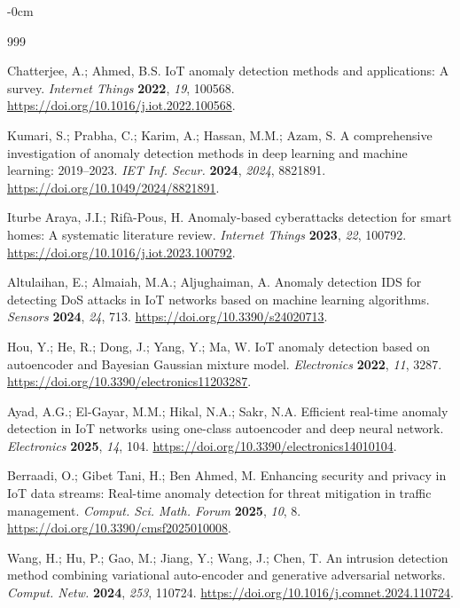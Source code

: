 \documentclass[futureinternet,article,accept,moreauthors]{Definitions/mdpi}
\begin{document}
\begin{adjustwidth}{-\extralength}{0cm}
\begin{thebibliography}{999}
  
  Chatterjee, A.; Ahmed, B.S. IoT anomaly detection methods and applications: A survey. \emph{Internet Things} \textbf{2022}, \emph{19}, 100568. \url{https://doi.org/10.1016/j.iot.2022.100568}.

  
  Kumari, S.; Prabha, C.; Karim, A.; Hassan, M.M.; Azam, S. A comprehensive investigation of anomaly detection methods in deep learning and machine learning: 2019--2023. \emph{IET Inf. Secur.} \textbf{2024}, \emph{2024}, 8821891. \url{https://doi.org/10.1049/2024/8821891}.

  
  Iturbe Araya, J.I.; Rifà-Pous, H. Anomaly-based cyberattacks detection for smart homes: A systematic literature review. \emph{Internet Things} \textbf{2023}, \emph{22}, 100792. \url{https://doi.org/10.1016/j.iot.2023.100792}.

  
  Altulaihan, E.; Almaiah, M.A.; Aljughaiman, A. Anomaly detection IDS for detecting DoS attacks in IoT networks based on machine learning algorithms. \emph{Sensors} \textbf{2024}, \emph{24}, 713. \url{https://doi.org/10.3390/s24020713}.

  
  Hou, Y.; He, R.; Dong, J.; Yang, Y.; Ma, W. IoT anomaly detection based on autoencoder and Bayesian Gaussian mixture model. \emph{Electronics} \textbf{2022}, \emph{11}, 3287. \url{https://doi.org/10.3390/electronics11203287}.

  
  Ayad, A.G.; El-Gayar, M.M.; Hikal, N.A.; Sakr, N.A. Efficient real-time anomaly detection in IoT networks using one-class autoencoder and deep neural network. \emph{Electronics} \textbf{2025}, \emph{14}, 104. \url{https://doi.org/10.3390/electronics14010104}.

  
  Berraadi, O.; Gibet Tani, H.; Ben Ahmed, M. Enhancing security and privacy in IoT data streams: Real-time anomaly detection for threat mitigation in traffic management. \emph{Comput. Sci. Math. Forum} \textbf{2025}, \emph{10}, 8. \url{https://doi.org/10.3390/cmsf2025010008}.

  
  Wang, H.; Hu, P.; Gao, M.; Jiang, Y.; Wang, J.; Chen, T. An intrusion detection method combining variational auto-encoder and generative adversarial networks. \emph{Comput. Netw.} \textbf{2024}, \emph{253}, 110724. \url{https://doi.org/10.1016/j.comnet.2024.110724}.


\end{thebibliography}
\end{adjustwidth}
\end{document}
